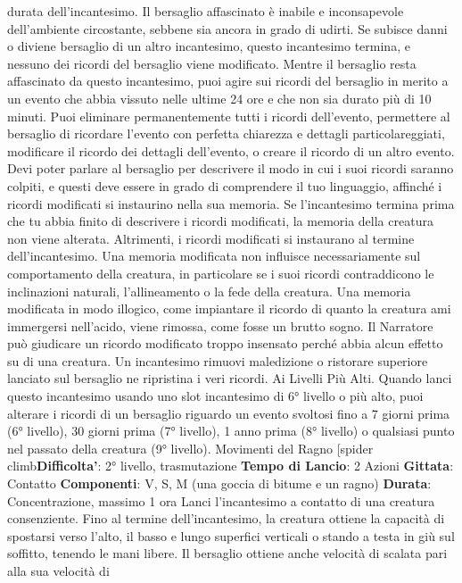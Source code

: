 \begin{multicols}{2}
durata dell’incantesimo. Il bersaglio affascinato è inabile
e inconsapevole dell’ambiente circostante, sebbene sia
ancora in grado di udirti. Se subisce danni o diviene
bersaglio di un altro incantesimo, questo incantesimo 
termina, e nessuno dei ricordi del bersaglio viene
modificato.
Mentre il bersaglio resta affascinato da questo
incantesimo, puoi agire sui ricordi del bersaglio in
merito a un evento che abbia vissuto nelle ultime 24 ore
e che non sia durato più di 10 minuti. Puoi eliminare
permanentemente tutti i ricordi dell’evento, permettere
al bersaglio di ricordare l’evento con perfetta chiarezza
e dettagli particolareggiati, modificare il ricordo dei
dettagli dell’evento, o creare il ricordo di un altro evento.
Devi poter parlare al bersaglio per descrivere il modo in
cui i suoi ricordi saranno colpiti, e questi deve essere in
grado di comprendere il tuo linguaggio, affinché i ricordi
modificati si instaurino nella sua memoria. Se
l’incantesimo termina prima che tu abbia finito di
descrivere i ricordi modificati, la memoria della creatura
non viene alterata. Altrimenti, i ricordi modificati si
instaurano al termine dell’incantesimo.
Una memoria modificata non influisce necessariamente
sul comportamento della creatura, in particolare se i
suoi ricordi contraddicono le inclinazioni naturali,
l’allineamento o la fede della creatura. Una memoria
modificata in modo illogico, come impiantare il ricordo di
quanto la creatura ami immergersi nell’acido, viene
rimossa, come fosse un brutto sogno. Il Narratore può
giudicare un ricordo modificato troppo insensato perché
abbia alcun effetto su di una creatura.
Un incantesimo rimuovi maledizione o ristorare
superiore lanciato sul bersaglio ne ripristina i veri
ricordi.
Ai Livelli Più Alti. Quando lanci questo incantesimo
usando uno slot incantesimo di 6° livello o più alto, puoi
alterare i ricordi di un bersaglio riguardo un evento
svoltosi fino a 7 giorni prima (6° livello), 30 giorni prima
(7° livello), 1 anno prima (8° livello) o qualsiasi punto
nel passato della creatura (9° livello).
Movimenti del Ragno
[spider climb\textbf{Difficolta'}:
2° livello, trasmutazione
\textbf{Tempo di Lancio}: 2 Azioni
\textbf{Gittata}: Contatto
\textbf{Componenti}: V, S, M (una goccia di bitume e un
ragno)
\textbf{Durata}: Concentrazione, massimo 1 ora
Lanci l’incantesimo a contatto di una creatura
consenziente. Fino al termine dell’incantesimo, la
creatura ottiene la capacità di spostarsi verso l’alto, il
basso e lungo superfici verticali o stando a testa in giù
sul soffitto, tenendo le mani libere. Il bersaglio ottiene
anche velocità di scalata pari alla sua velocità di

\end{multicols}
